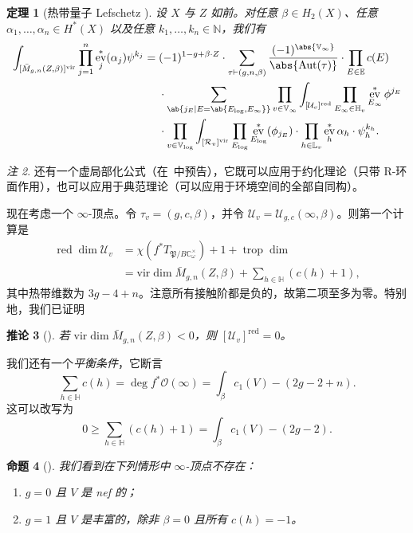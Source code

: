 \documentclass{amsart}
\newtheorem{thm}{定理}[section]
\newtheorem{cor}[thm]{推论}
\newtheorem{prop}[thm]{命题}
\theoremstyle{definition}
\theoremstyle{remark}
\newtheorem{rmk}[thm]{注}
\theoremstyle{plain}
\theoremstyle{definition}
\theoremstyle{remark}
\newcommand{\N}{\mathbb{N}}
\newcommand{\C}{\mathbb{C}}
\newcommand{\E}{\mathbb{E}}
\newcommand{\V}{\mathbb{V}}
\renewcommand{\H}{\mathbb{H}}
\renewcommand{\L}{\mathbb{L}}
\newcommand{\mc}[1]{\mathcal{#1}}
\newcommand{\mf}[1]{\mathfrak{#1}}
\newcommand{\mr}[1]{\mathrm{#1}}
\newcommand{\on}[1]{\operatorname{#1}}
\newcommand{\1}{\mathbf{1}}
\newcommand{\2}{\mathbf{2}}
\newcommand{\3}{\mathbf{3}}
\newcommand{\vir}{\mr{vir}}
\DeclareMathOperator{\Aut}{Aut}
\DeclareMathOperator{\ev}{ev}
\begin{document}
\begin{thm}[热带量子 Lefschetz {\cite{CJRtropical2025}}]
    设 \(X\) 与 \(Z\) 如前。对任意 \(\beta \in H_2(X)\)、任意 \(\alpha_1, \ldots, \alpha_n \in H^*(X)\) 以及任意 \(k_1, \ldots, k_n \in \N\)，我们有
    \begin{align*}
        \int_{[\bar{M}_{g,n}(Z,\beta)]^{\vir}} \prod_{j=1}^n \ev_j^* (\alpha_j) \psi^{k_j}={}& (-1)^{1-g+\beta \cdot Z} \cdot \sum_{\tau \vdash (g,n,\beta)} \frac{(-1)^{\abs{\V_{\infty}}}}{\abs{\Aut(\tau)}} \cdot \prod_{E \in \E} c(E) \\
        & \cdot \sum_{\ab\{j_E \mid E = \ab\{E_{\log}, E_{\infty}\}\}}  \prod_{v \in \V_{\infty}} \int_{[\mc{U}_v]^{\on{red}}} \prod_{E_{\infty} \in \H_v} \ev_{E_{\infty}}^* \phi^{j_E}  \\
        &  \cdot \prod_{v \in \V_{\log}} \int_{[\mc{R}_v]^{\vir}} \prod_{E_{\log}} \ev_{E_{\log}}^* (\phi_{j_E}) \cdot \prod_{h \in \L_v} \ev_h^* \alpha_h \cdot \psi_h^{k_h} .
    \end{align*}
\end{thm}

\begin{rmk}
    还有一个虚局部化公式（在~\cite{CJRlocalization}中预告），它既可以应用于约化理论（只带 R-环面作用），也可以应用于典范理论（可以应用于环境空间的全部自同构）。
\end{rmk}

现在考虑一个 \(\infty\)-顶点。令 \(\tau_v = (g, c, \beta)\)，并令 \(\mc{U}_v = \mc{U}_{g,c}(\infty, \beta)\)。则第一个计算是
\begin{align*}
    \on{red}\dim \mc{U}_v &= \chi(f^* T_{\mf{P}/B \C^{\times}_{\omega}}) + 1 + \on{trop}\dim  \\
    &= \vir\dim \bar{M}_{g,n}(Z, \beta) + \sum_{h \in \H } (c(h) + 1),
\end{align*}
其中热带维数为 \(3g-4+n\)。注意所有接触阶都是负的，故第二项至多为零。特别地，我们已证明
\begin{cor}[{\cite{CJRpunctured}}]
    若 \(\vir\dim \bar{M}_{g,n}(Z,\beta) < 0\)，则 \([\mc{U}_v]^{\on{red}} = 0\)。
\end{cor}
我们还有一个\textit{平衡条件}，它断言
\begin{equation}\label{eqn:balancing condition}
    \sum_{h \in \H} c(h) = \deg f^* \mc{O}(\infty) = \int_{\beta} c_1(V) - (2g-2+n).
\end{equation}
这可以改写为
\[ 0 \geq \sum_{h \in \H} (c(h)+1) = \int_{\beta} c_1(V) - (2g-2). \]
\begin{prop}[{\cite{CJRpunctured}}]
    我们看到在下列情形中 \(\infty\)-顶点不存在：
    \begin{enumerate}
        \item \(g = 0\) 且 \(V\) 是 nef 的；
        \item \(g=1\) 且 \(V\) 是丰富的，除非 \(\beta = 0\) 且所有 \(c(h) = -1\)。
    \end{enumerate}
\end{prop}
\end{document}
